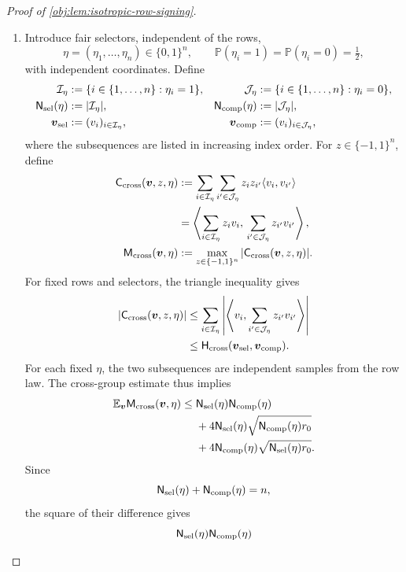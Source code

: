\begin{proof}[Proof of \cref{obj:lem:isotropic-row-signing}]
\begin{enumerate}
\item Introduce fair selectors, independent of the rows,
\[
\eta=(\eta_1,\ldots,\eta_n)\in\{0,1\}^n,
\qquad
\mathbb P(\eta_i=1)=\mathbb P(\eta_i=0)=\tfrac12,
\]
with independent coordinates. Define
\[
\begin{aligned}
\mathcal I_\eta&:=\{i\in\{1,\ldots,n\}:\eta_i=1\},&
\mathcal J_\eta&:=\{i\in\{1,\ldots,n\}:\eta_i=0\},\\
\mathsf N_{\rm sel}(\eta)&:=|\mathcal I_\eta|,&
\mathsf N_{\rm comp}(\eta)&:=|\mathcal J_\eta|,\\
\boldsymbol v_{\rm sel}&:=(v_i)_{i\in\mathcal I_\eta},&
\boldsymbol v_{\rm comp}&:=(v_i)_{i\in\mathcal J_\eta},
\end{aligned}
\]
where the subsequences are listed in increasing index order. For \(z\in\{-1,1\}^n\), define
\[
\begin{aligned}
\mathsf C_{\rm cross}(\boldsymbol v,z,\eta)
&:=\sum_{i\in\mathcal I_\eta}\sum_{i'\in\mathcal J_\eta}
z_i z_{i'}\langle v_i,v_{i'}\rangle\\
&=\left\langle
\sum_{i\in\mathcal I_\eta}z_i v_i,\,
\sum_{i'\in\mathcal J_\eta}z_{i'}v_{i'}
\right\rangle,\\
\mathsf M_{\rm cross}(\boldsymbol v,\eta)
&:=\max_{z\in\{-1,1\}^n}
|\mathsf C_{\rm cross}(\boldsymbol v,z,\eta)|.
\end{aligned}
\]
For fixed rows and selectors, the triangle inequality gives
\[
\begin{aligned}
|\mathsf C_{\rm cross}(\boldsymbol v,z,\eta)|
&\leq
\sum_{i\in\mathcal I_\eta}
\left|\left\langle
v_i,\sum_{i'\in\mathcal J_\eta}z_{i'}v_{i'}
\right\rangle\right|\\
&\leq\mathsf H_{\rm cross}(\boldsymbol v_{\rm sel},\boldsymbol v_{\rm comp}).
\end{aligned}
\]
For each fixed \(\eta\), the two subsequences are independent samples from the row law. The cross-group estimate thus implies
\[
\begin{aligned}
\mathbb E_{\boldsymbol v}\mathsf M_{\rm cross}(\boldsymbol v,\eta)
\leq{}&
\mathsf N_{\rm sel}(\eta)\mathsf N_{\rm comp}(\eta)\\
&+4\mathsf N_{\rm sel}(\eta)
\sqrt{\mathsf N_{\rm comp}(\eta)r_0}\\
&+4\mathsf N_{\rm comp}(\eta)
\sqrt{\mathsf N_{\rm sel}(\eta)r_0}.
\end{aligned}
\]
Since
\[
\mathsf N_{\rm sel}(\eta)+\mathsf N_{\rm comp}(\eta)=n,
\]
the square of their difference gives
\[
\mathsf N_{\rm sel}(\eta)\mathsf N_{\rm comp}(\eta)
\]
\end{enumerate}
\end{proof}
